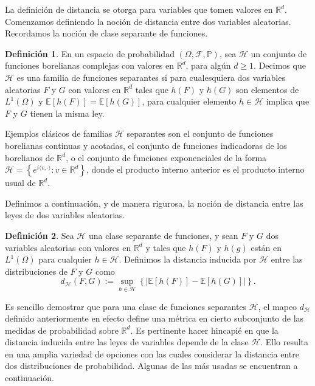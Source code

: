 \documentclass[letterpaper,twoside,12pt]{book}
\newcommand{\R}{\mathbb{R}}
\newcommand{\F}{\mathcal{F}}
\newcommand{\E}{\mathbb{E}}
\renewcommand{\P}{\mathbb{P}}
\newcommand{\1}{\mathds{1}}
\newcommand{\abs}[1]{\left\lvert #1 \right\rvert}
\theoremstyle{definition}
\newtheorem{dfn}{Definición}
\theoremstyle{definition}
\theoremstyle{remark}
\theoremstyle{definition}
\theoremstyle{definition}
\theoremstyle{definition}
\theoremstyle{definition}
\theoremstyle{definition}
\begin{document}
La definición de distancia se otorga para variables que tomen valores en $\R^d$. Comenzamos definiendo la noción de distancia entre dos variables aleatorias. Recordamos la noción de clase separante de funciones.

\begin{dfn} 
 En un espacio de probabilidad $(\Omega, \F, \P)$, sea $\mathscr{H}$ un conjunto de funciones borelianas complejas con valores en $\R^d$, para algún $d\geq1$. Decimos que $\mathscr{H}$ es una familia de funciones separantes si para cualesquiera dos variables aleatorias $F$ y $G$ con valores en $\R^{d}$ tales que $h(F)$ y $h(G)$ son elementos de $L^1(\Omega)$ y $\E\left[h(F)\right]=\E\left[h(G)\right]$, para cualquier elemento $h\in \mathscr{H}$ implica que $F$ y $G$ tienen la misma ley.
 \end{dfn}
Ejemplos clásicos de familias $\mathscr{H}$ separantes son el conjunto de funciones borelianas continuas y acotadas, el conjunto de funciones indicadoras de los borelianos de $\R^{d}$, o el conjunto de funciones exponenciales de la forma $\mathscr{H}=\left\{e^{i \langle v,\cdot\rangle}: v\in \R^{d} \right\}$, donde el producto interno anterior es el producto interno usual de $\R^{d}$.

Definimos a continuación, y de manera rigurosa, la noción de distancia entre las leyes de dos variables aleatorias.
\begin{dfn} 
 Sea $\mathscr{H}$ una clase separante de funciones, y sean $F$ y $G$ dos variables aleatorias con valores en $\R^{d}$ y tales que $h(F)$ y $h(g)$ están en $L^1(\Omega)$ para cualquier $h\in \mathscr{H}$. Definimos la distancia inducida por $\mathscr{H}$ entre las distribuciones de $F$ y $G$ como 
 \[
 d_\mathscr{H}(F,G):=\sup_{h\in \mathscr{H}}\left\{\abs{\E\left[h(F)\right]-\E\left[h(G)\right]}\right\}.
 \]
 \end{dfn}

Es sencillo demostrar que para una clase de funciones separantes $\mathscr{H}$, el mapeo $d_\mathscr{H}$ definido anteriormente en efecto define una métrica en cierto subconjunto de las medidas de probabilidad sobre $\R^{d}$. Es pertinente hacer hincapié en que la distancia inducida entre las leyes de variables depende de la clase $\mathscr{H}$. Ello resulta en una amplia variedad de opciones con las cuales considerar la distancia entre dos distribuciones de probabilidad. Algunas de las más usadas se encuentran a continuación.
\end{document}
